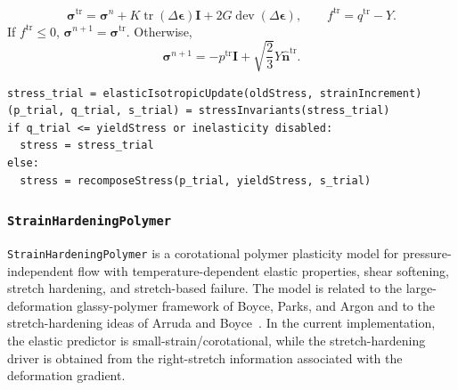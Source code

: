 \begin{equation}
  \boldsymbol{\sigma}^{\mathrm{tr}}
  = \boldsymbol{\sigma}^{n}+K\operatorname{tr}(\Delta\boldsymbol{\epsilon})\mathbf{I}
  +2G\operatorname{dev}(\Delta\boldsymbol{\epsilon}),
  \qquad
  f^{\mathrm{tr}}=q^{\mathrm{tr}}-Y .
\end{equation}
If \(f^{\mathrm{tr}}\le 0\), \(\boldsymbol{\sigma}^{n+1}=\boldsymbol{\sigma}^{\mathrm{tr}}\).  Otherwise,
\begin{equation}
  \boldsymbol{\sigma}^{n+1}= -p^{\mathrm{tr}}\mathbf{I}
  + \sqrt{\frac{2}{3}}Y\widehat{\mathbf{n}}^{\mathrm{tr}}.
\end{equation}

\begin{lstlisting}[caption={PerfectlyPlastic stress update.},label={alg:perfectly-plastic-update},basicstyle=\ttfamily\small]
stress_trial = elasticIsotropicUpdate(oldStress, strainIncrement)
(p_trial, q_trial, s_trial) = stressInvariants(stress_trial)
if q_trial <= yieldStress or inelasticity disabled:
  stress = stress_trial
else:
  stress = recomposeStress(p_trial, yieldStress, s_trial)
\end{lstlisting}

\subsubsection{\texttt{StrainHardeningPolymer}}
\label{subsubsec:strain-hardening-polymer-model}

\texttt{StrainHardeningPolymer} is a corotational polymer plasticity model for pressure-independent flow with temperature-dependent elastic properties, shear softening, stretch hardening, and stretch-based failure.  The model is related to the large-deformation glassy-polymer framework of Boyce, Parks, and Argon and to the stretch-hardening ideas of Arruda and Boyce~\cite{boyce1988polymer,arruda1993boyce}.  In the current implementation, the elastic predictor is small-strain/corotational, while the stretch-hardening driver is obtained from the right-stretch information associated with the deformation gradient.

